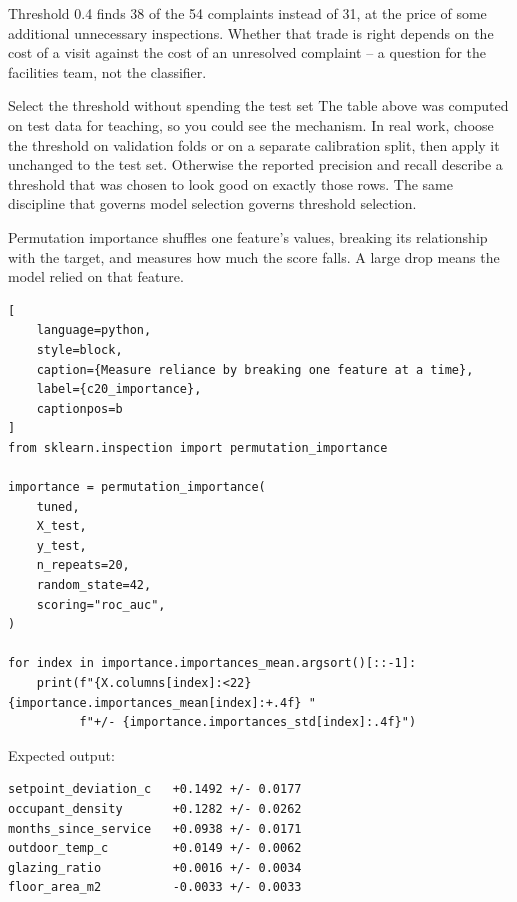 Threshold 0.4 finds 38 of the 54 complaints instead of 31, at the price of some
additional unnecessary inspections. Whether that trade is right depends on the
cost of a visit against the cost of an unresolved complaint -- a question for the
facilities team, not the classifier.

\begin{ExplainBox}{Select the threshold without spending the test set}
The table above was computed on test data for teaching, so you could see the
mechanism. In real work, choose the threshold on validation folds or on a
separate calibration split, then apply it unchanged to the test set. Otherwise
the reported precision and recall describe a threshold that was chosen to look
good on exactly those rows. The same discipline that governs model selection
governs threshold selection.
\end{ExplainBox}

\label{sec:c20-importance}

Permutation importance shuffles one feature's values, breaking its relationship
with the target, and measures how much the score falls. A large drop means the
model relied on that feature.

\begin{lstlisting}[
    language=python,
    style=block,
    caption={Measure reliance by breaking one feature at a time},
    label={c20_importance},
    captionpos=b
]
from sklearn.inspection import permutation_importance

importance = permutation_importance(
    tuned,
    X_test,
    y_test,
    n_repeats=20,
    random_state=42,
    scoring="roc_auc",
)

for index in importance.importances_mean.argsort()[::-1]:
    print(f"{X.columns[index]:<22} {importance.importances_mean[index]:+.4f} "
          f"+/- {importance.importances_std[index]:.4f}")
\end{lstlisting}

Expected output:

\begin{lstlisting}[language=text, style=block, caption={Measured reliance, ranked}, label={c20_importance_output}, captionpos=b]
setpoint_deviation_c   +0.1492 +/- 0.0177
occupant_density       +0.1282 +/- 0.0262
months_since_service   +0.0938 +/- 0.0171
outdoor_temp_c         +0.0149 +/- 0.0062
glazing_ratio          +0.0016 +/- 0.0034
floor_area_m2          -0.0033 +/- 0.0033
\end{lstlisting}

